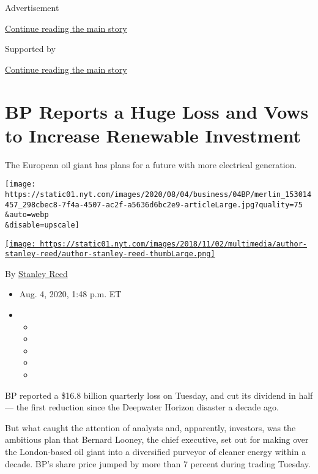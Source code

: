 Advertisement

\protect\hyperlink{after-top}{Continue reading the main story}

Supported by

\protect\hyperlink{after-sponsor}{Continue reading the main story}

\hypertarget{bp-reports-a-huge-loss-and-vows-to-increase-renewable-investment}{%
\section{BP Reports a Huge Loss and Vows to Increase Renewable
Investment}\label{bp-reports-a-huge-loss-and-vows-to-increase-renewable-investment}}

The European oil giant has plans for a future with more electrical
generation.

\texttt{[image: https://static01.nyt.com/images/2020/08/04/business/04BP/merlin\_153014457\_298cbec8-7f4a-4507-ac2f-a5636d6bc2e9-articleLarge.jpg?quality=75\\\&auto=webp\\\&disable=upscale]}

\href{https://www.nytimes.com/by/stanley-reed}{\texttt{[image: https://static01.nyt.com/images/2018/11/02/multimedia/author-stanley-reed/author-stanley-reed-thumbLarge.png]}}

By \href{https://www.nytimes.com/by/stanley-reed}{Stanley Reed}

\begin{itemize}
\item
  Aug. 4, 2020, 1:48 p.m. ET
\item
  \begin{itemize}
  \item
  \item
  \item
  \item
  \item
  \end{itemize}
\end{itemize}

BP reported a \$16.8 billion quarterly loss on Tuesday, and cut its
dividend in half --- the first reduction since the Deepwater Horizon
disaster a decade ago.

But what caught the attention of analysts and, apparently, investors,
was the ambitious plan that Bernard Looney, the chief executive, set out
for making over the London-based oil giant into a diversified purveyor
of cleaner energy within a decade. BP's share price jumped by more than
7 percent during trading Tuesday.

